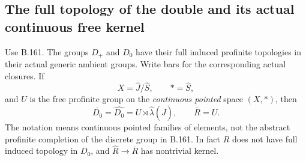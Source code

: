 \subsection*{The full topology of the double and its actual continuous free kernel}
\label{stmt:B162}
Use B.161. The groups $D_+$ and $D_0$ have their full induced profinite
topologies in their actual generic ambient groups. Write bars for the
corresponding actual closures. If
\[
 X=\widehat J/\widehat S,\qquad *=\widehat S,
\]
and $U$ is the free profinite group on the \emph{continuous pointed}
space $(X,*)$, then
\begin{equation}\label{eq:B162-model}
 \overline{D_0}=\widehat{D_0}
       =U\rtimes\widehat\lambda(\widehat J),\qquad
 \overline R=U.
\end{equation}
The notation means continuous pointed families of elements, not the
abstract profinite completion of the discrete group in B.161.
In fact $R$ does not have full induced topology in $D_0$, and
$\widehat R\to\overline R$ has nontrivial kernel.
